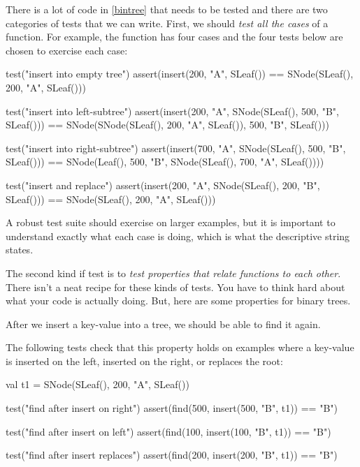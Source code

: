\documentclass{book}
\begin{document}
There is a lot of code in \cref{bintree} that needs to be tested and there
are two categories of tests that we can write. First, we should \emph{test all the
cases} of a function. For example, the  function has
four cases and the four tests below are chosen to exercise each case:
\begin{scalacode}
test("insert into empty tree") {
  assert(insert(200, "A", SLeaf()) == SNode(SLeaf(), 200, "A", SLeaf()))
}

test("insert into left-subtree") {
  assert(insert(200, "A", SNode(SLeaf(), 500, "B", SLeaf()))
    == SNode(SNode(SLeaf(), 200, "A", SLeaf()), 500, "B", SLeaf()))
}

test("insert into right-subtree") {
  assert(insert(700, "A", SNode(SLeaf(), 500, "B", SLeaf()))
    == SNode(Leaf(), 500, "B", SNode(SLeaf(), 700, "A", SLeaf())))
}

test("insert and replace") {
  assert(insert(200, "A", SNode(SLeaf(), 200, "B", SLeaf()))
    == SNode(SLeaf(), 200, "A", SLeaf()))
}
\end{scalacode}

A robust test suite should exercise  on larger examples, but
it is important to understand exactly what each case is doing, which is what the
descriptive string states.

The second kind if test is to \emph{test properties that relate functions
to each other}. There isn't a neat recipe for these kinds of tests. You have
to think hard about what your code is actually doing. But, here
are some properties for binary trees.

\begin{property}
After we insert a key-value into a tree, we should be able to
find it again.
\end{property}

The following tests check that this property holds on examples
where a key-value is inserted on the left, inserted on the right, or replaces
the root:
%
\begin{scalacode}
val t1 = SNode(SLeaf(), 200, "A", SLeaf())

test("find after insert on right") {
  assert(find(500, insert(500, "B", t1)) == "B")
}

test("find after insert on left") {
  assert(find(100, insert(100, "B", t1)) == "B")
}

test("find after insert replaces") {
  assert(find(200, insert(200, "B", t1)) == "B")
}
\end{scalacode}
\end{document}

